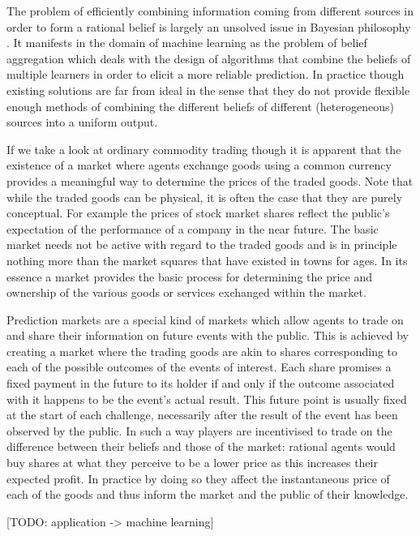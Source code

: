 \documentclass[bsc,frontabs,twoside,singlespacing,parskip,deptreport]{infthesis}     %
\begin{document}
The problem of efficiently combining information coming from different sources in order to form a rational belief is largely an unsolved issue in Bayesian philosophy \cite{greene_collective_2010}. It manifests in the domain of machine learning as the problem of belief aggregation which deals with the design of algorithms that combine the beliefs of multiple learners in order to elicit a more reliable prediction. In practice though existing solutions are far from ideal in the sense that they do not provide flexible enough methods of combining the different beliefs of different (heterogeneous) sources into a uniform output. 

    If we take a look at ordinary commodity trading though it is apparent that the existence of a market where agents exchange goods using a common currency provides a meaningful way to determine the prices of the traded goods. Note that while the traded goods can be physical, it is often the case that they are purely conceptual. For example the prices of stock market shares reflect the public's expectation of the performance of a company in the near future. The basic market needs not be active with regard to the traded goods and is in principle nothing more than the market squares that have existed in towns for ages. In its essence a market provides the basic process for determining the price and ownership of the various goods or services exchanged within the market.

    Prediction markets are a special kind of markets which allow agents to trade on and share their information on future events with the public. This is achieved by creating a market where the trading goods are akin to shares corresponding to each of the possible outcomes of the events of interest. Each share promises a fixed payment in the future to its holder if and only if the outcome associated with it happens to be the event's actual result. This future point is usually fixed at the start of each challenge, necessarily after the result of the event has been observed by the public. In such a way players are incentivised to trade on the difference between their beliefs and those of the market: rational agents would buy shares at what they perceive to be a lower price as this increases their expected profit. In practice by doing so they affect the instantaneous price of each of the goods and thus inform the market and the public of their knowledge. 

	
[TODO: application -> machine learning]
\end{document}
